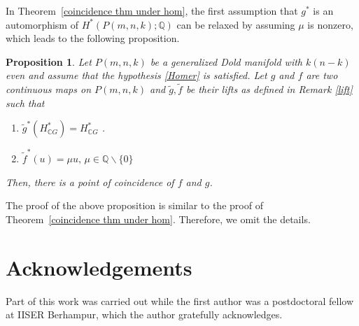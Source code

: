 \documentclass{amsart}
\newtheorem{proposition}[theorem]{Proposition}
\newcommand{\thmref}[1]{Theorem~\ref{#1}}
\begin{document}
In \thmref{coincidence thm under hom}, the first assumption that $g^*$ is an automorphism %
of $H^*(P(m,n,k); \mathbb{Q})$ can %
be relaxed by assuming $\mu$ is nonzero, which leads %
to the following proposition. 
\begin{proposition}
	Let %
$P(m,n,k)$ be a generalized Dold manifold with $k(n-k)$ even and assume that the hypothesis \eqref{Homer} is satisfied. Let $g$ and $f$ are two continuous maps on $P(m,n,k)$ and $\tilde g, \tilde f$ be their lifts as defined in  Remark \ref{lift} such %
that
	\begin{enumerate}
		\item $\tilde g^*(H^*_{\mathbb CG})= H^*_{\mathbb CG}$%
.
		\item $\tilde f^*(u)=\mu u,\, \mu\in \mathbb Q\backslash \{0\}$
	\end{enumerate}
Then, there is a point of coincidence of $f$ and  $g$.
\end{proposition}
The proof of the above proposition is similar to the proof of \thmref{coincidence thm under hom}. Therefore, we omit the %
details.

\section*{Acknowledgements}
Part %
of this work was carried out while the first author was a postdoctoral fellow at IISER Berhampur, which the author gratefully acknowledges.
\end{document}
